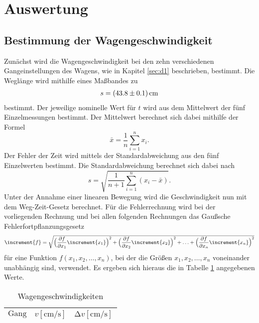 \section{Auswertung}
\label{sec:Auswertung}
\subsection{Bestimmung der Wagengeschwindigkeit}
Zunächst wird die Wagengeschwindigkeit bei den zehn verschiedenen Gangeinstellungen des Wagens, wie in Kapitel \ref{sec:d1} beschrieben, bestimmt.
Die Weglänge wird mithilfe eines Maßbandes zu
\begin{align*}
  s = \SI{43.8 +- 0.1}{\centi\metre}
\end{align*}
bestimmt.
Der jeweilige nominelle Wert für $t$ wird aus dem Mittelwert der fünf Einzelmessungen bestimmt.
Der Mittelwert berechnet sich dabei mithilfe der Formel
\begin{equation}
 \bar{x} = \frac{1}{n} \sum_{i=1}^n x_i.
\end{equation}
Der Fehler der Zeit wird mittels der Standardabweichung aus den fünf Einzelwerten bestimmt.
Die Standardabweichung berechnet sich dabei nach
\begin{equation}
  s = \sqrt{\frac{1}{n+1} \sum_{i=1}^n (x_i - \bar{x}) }.
\end{equation}
Unter der Annahme einer linearen Bewegung wird die Geschwindigkeit nun mit dem Weg-Zeit-Gesetz berechnet.
Für die Fehlerrechnung wird bei der vorliegenden Rechnung und bei allen folgenden Rechnungen das Gaußsche Fehlerfortpflanzungsgesetz
\begin{equation}
\increment{f} = \sqrt{\Bigl(\frac{\partial f}{\partial x_1}\increment{x_1}\Bigr)^2 + \Bigl(\frac{\partial f}{\partial x_2}\increment{x_2}\Bigr)^2 + \dotsc + \Bigl(\frac{\partial f}{\partial x_n}\increment{x_n}\Bigr)^2}
\end{equation}
für eine Funktion $f(x_1,x_2, \dotsc ,x_n)$, bei der die Größen $x_1, x_2, \dotsc , x_n$ voneinander unabhängig sind, verwendet.
Es ergeben sich hieraus die in Tabelle \ref{tab:Geschwindigkeiten} angegebenen Werte.\\

\begin{table}[H]
  \centering
  \caption{Wagengeschwindigkeiten}
  \label{tab:Geschwindigkeiten}
  \begin{tabular}{c c c}
    \toprule
    {$\text{Gang}$} & {$v [\si{\centi\metre\per\second}]$} & {$\increment v [\si{\centi\metre\per\second}]$}\\
    \midrule
    
    \bottomrule
  \end{tabular}
\end{table}

